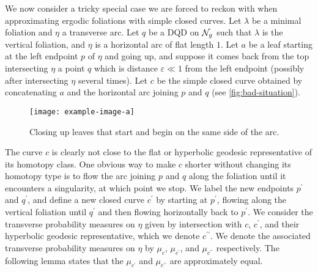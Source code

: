 \documentclass[12pt, reqno]{amsart}
\begin{document}
We now consider a tricky special case we are forced to reckon with when approximating ergodic foliations with simple closed curves.
Let $\lambda$ be a minimal foliation and $\eta$ a transverse arc.
Let $q$ be a DQD on $\mathcal{N}_g$ such that $\lambda$ is the vertical foliation, and $\eta$ is a horizontal arc of flat length $1$.
Let $a$ be a leaf starting at the left endpoint $p$ of $\eta$ and going up, and suppose it comes back from the top intersecting $\eta$ a point $q$ which is distance $\varepsilon \ll 1$ from the left endpoint (possibly after intersecting $\eta$ several times).
Let $c$ be the simple closed curve obtained by concatenating $a$ and the horizontal arc joining $p$ and $q$ (see \autoref{fig:bad-situation}).
\begin{figure}[h]
  \centering
  \texttt{[image: example-image-a]}
  \caption{Closing up leaves that start and begin on the same side of the arc.}
  \label{fig:bad-situation}
\end{figure}
The curve $c$ is clearly not close to the flat or hyperbolic geodesic representative of its homotopy class.
One obvious way to make $c$ shorter without changing its homotopy type is to flow the arc joining $p$ and $q$ along the foliation until it encounters a singularity, at which point we stop.
We label the new endpoints $p^{\prime}$ and $q^{\prime}$, and define a new closed curve $c^{\prime}$ by starting at $p^{\prime}$, flowing along the vertical foliation until $q^{\prime}$ and then flowing horizontally back to $p^{\prime}$.
We consider the transverse probability measures on $\eta$ given by intersection with $c$, $c^{\prime}$, and their hyperbolic geodesic representative, which we denote $c^{\prime \prime}$.
We denote the associated transverse probability measures on $\eta$ by $\mu_c$, $\mu_{c^{\prime}}$, and $\mu_{c^{\prime \prime}}$ respectively.
The following lemma states that the $\mu_{c^{\prime}}$ and $\mu_{c^{\prime \prime}}$ are approximately equal.
\end{document}

